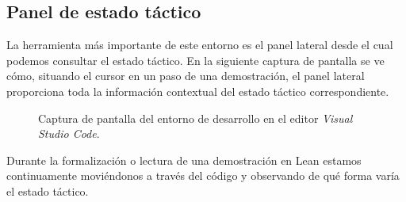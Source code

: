 \subsection*{Panel de estado t\'{a}ctico}

La herramienta más importante de este entorno es el panel lateral desde el cual
podemos consultar el estado táctico. En la siguiente captura de pantalla se ve
cómo, situando el cursor en un paso de una demostración, el panel lateral
proporciona toda la información contextual del estado táctico correspondiente.

\begin{figure}[htbp]
	\centerline{}
	\caption*{Captura de pantalla del entorno de desarrollo en el editor \textit{Visual Studio Code}.}
	\label{figure:entorno}
\end{figure}

Durante la formalización o lectura de una demostración en Lean estamos
continuamente moviéndonos a través del código y observando de qué forma varía el
estado táctico.






